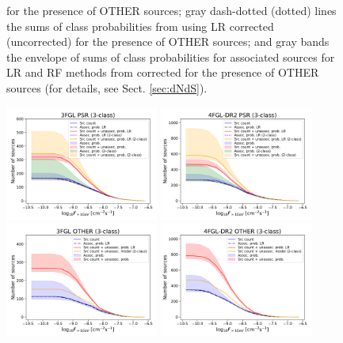 \documentclass[referee]{aa} %
\begin{document}
\begin{figure}[h]
{for the presence of OTHER sources; gray dash-dotted (dotted) lines the sums of class probabilities from \cite{2016ApJ...820....8S} using LR corrected (uncorrected) for the presence of OTHER sources; and gray bands the envelope of sums of class probabilities for associated sources for LR and RF methods from \cite{2016ApJ...820....8S} corrected for the presence of OTHER sources (for details, see Sect. \ref{sec:dNdS}).}  
\label{fig:logN_logS}
\end{figure}


\begin{figure}[h]
\centering
\includegraphics[width=0.45\textwidth]{plots/N_logS_3FGL_PSR_3classes.pdf}
\includegraphics[width=0.45\textwidth]{plots/N_logS_4FGL-DR2_PSR_3classes.pdf} \\
\includegraphics[width=0.45\textwidth]{plots/N_logS_3FGL_OTHER_3classes.pdf}
\includegraphics[width=0.45\textwidth]{plots/N_logS_4FGL-DR2_OTHER_3classes.pdf}

\end{figure}
\end{document}
